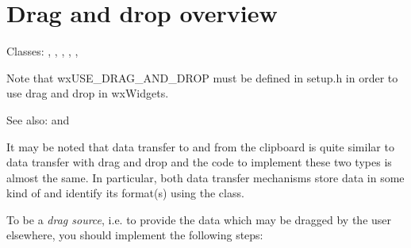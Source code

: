 \section{Drag and drop overview}\label{wxdndoverview}

Classes: , 
, 
, 
, 
, 

Note that wxUSE\_DRAG\_AND\_DROP must be defined in setup.h in order
to use drag and drop in wxWidgets.

See also:  and 

It may be noted that data transfer to and from the clipboard is quite
similar to data transfer with drag and drop and the code to implement
these two types is almost the same. In particular, both data transfer
mechanisms store data in some kind of 
and identify its format(s) using the 
class.

To be a {\it drag source}, i.e. to provide the data which may be dragged by
the user elsewhere, you should implement the following steps:

